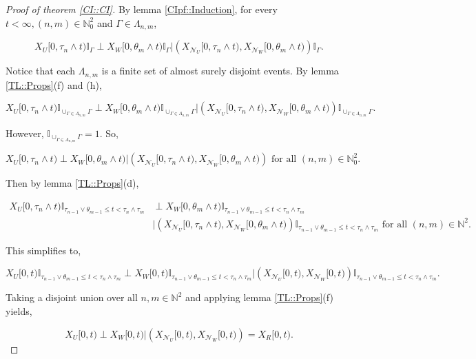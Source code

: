 \documentclass[12pt]{article}
\newcommand{\mb}{\mathbb}
\newcommand{\mc}{\mathcal}
\newcommand{\te}{\text}
\newcommand{\neigh}[1]{\mc{N}_{#1}}					%
\newcommand{\Xf}{X}									%
\newcommand{\vind}[1]{_{#1}}						%
\newcommand{\tmi}[1]{#1}							%
\newcommand{\rt}{\tau}								%
\renewcommand{\it}[1]{_{#1}}						%
\newcommand{\seto}{U}								%
\newcommand{\sett}{W}								%
\newcommand{\setc}{R}								%
\newcommand{\rtt}{\theta}							%
\newcommand{\apath}{\Gamma}						%
\newcommand{\pathset}[2]{\Lambda_{#1,#2}}		%
\newcommand{\indo}{n}							%
\newcommand{\indt}{m}							%
\begin{document}
\begin{proof}[Proof of theorem \ref{CI::CI}]

By lemma \ref{CIpf::Induction}, for every \(t < \infty, (\indo,\indt) \in \mb{N}_0^2\) and \(\apath \in \pathset{\indo}{\indt}\),

\[\Xf\vind{\seto}\tmi{[0,\rt\it{\indo}\wedge t)}\mb{I}_{\apath}\perp \Xf\vind{\sett}\tmi{[0,\rtt\it{\indt}\wedge t)}\mb{I}_{\apath}|\left(\Xf\vind{\neigh{\seto}}\tmi{[0,\rt\it{\indo}\wedge t)},\Xf\vind{\neigh{\sett}}\tmi{[0,\rtt\it{\indt}\wedge t)}\right)\mb{I}_{\apath}.\]

Notice that each \(\pathset{\indo}{\indt}\) is a finite set of almost surely disjoint events. By lemma \ref{TL::Props}(f) and (h),

\[\Xf\vind{\seto}\tmi{[0,\rt\it{\indo}\wedge t)}\mb{I}_{\cup_{\apath \in \pathset{\indo}{\indt}}\apath}\perp \Xf\vind{\sett}\tmi{[0,\rtt\it{\indt}\wedge t)}\mb{I}_{\cup_{\apath \in \pathset{\indo}{\indt}}\apath}|\left(\Xf\vind{\neigh{\seto}}\tmi{[0,\rt\it{\indo}\wedge t)},\Xf\vind{\neigh{\sett}}\tmi{[0,\rtt\it{\indt}\wedge t)}\right)\mb{I}_{\cup_{\apath \in \pathset{\indo}{\indt}}\apath}.\]

However, \(\mb{I}_{\cup_{\apath \in \pathset{\indo}{\indt}}\apath} = 1\). So, 

\[\Xf\vind{\seto}\tmi{[0,\rt\it{\indo}\wedge t)}\perp \Xf\vind{\sett}\tmi{[0,\rtt\it{\indt}\wedge t)}|\left(\Xf\vind{\neigh{\seto}}\tmi{[0,\rt\it{\indo}\wedge t)},\Xf\vind{\neigh{\sett}}\tmi{[0,\rtt\it{\indt}\wedge t)}\right) \te{ for all } (\indo,\indt)\in\mb{N}_0^2.\]

Then by lemma \ref{TL::Props}(d),

\begin{align*}
\Xf\vind{\seto}\tmi{[0,\rt\it{\indo}\wedge t)}\mb{I}_{\rt\it{\indo-1}\vee\rtt\it{\indt-1} \leq t < \rt\it{\indo}\wedge\rt\it{\indt}}&\perp \Xf\vind{\sett}\tmi{[0,\rtt\it{\indt}\wedge t)}\mb{I}_{\rt\it{\indo-1}\vee\rtt\it{\indt-1} \leq t < \rt\it{\indo}\wedge\rt\it{\indt}}\\
&|\left(\Xf\vind{\neigh{\seto}}\tmi{[0,\rt\it{\indo}\wedge t)},\Xf\vind{\neigh{\sett}}\tmi{[0,\rtt\it{\indt}\wedge t)}\right)\mb{I}_{\rt\it{\indo-1}\vee\rtt\it{\indt-1} \leq t < \rt\it{\indo}\wedge\rt\it{\indt}} \te{ for all } (\indo,\indt)\in\mb{N}^2.
\end{align*}


This simplifies to,

\[\Xf\vind{\seto}\tmi{[0,t)}\mb{I}_{\rt\it{\indo-1}\vee\rtt\it{\indt-1} \leq t < \rt\it{\indo}\wedge\rt\it{\indt}}\perp \Xf\vind{\sett}\tmi{[0,t)}\mb{I}_{\rt\it{\indo-1}\vee\rtt\it{\indt-1} \leq t < \rt\it{\indo}\wedge\rt\it{\indt}}|\left(\Xf\vind{\neigh{\seto}}\tmi{[0,t)},\Xf\vind{\neigh{\sett}}\tmi{[0,t)}\right)\mb{I}_{\rt\it{\indo-1}\vee\rtt\it{\indt-1} \leq t < \rt\it{\indo}\wedge\rt\it{\indt}}.\]

Taking a disjoint union over all \(n,m\in\mb{N}^2\) and applying lemma \ref{TL::Props}(f) yields,

\[\Xf\vind{\seto}\tmi{[0,t)}\perp \Xf\vind{\sett}\tmi{[0,t)}|\left(\Xf\vind{\neigh{\seto}}\tmi{[0,t)},\Xf\vind{\neigh{\sett}}\tmi{[0,t)}\right) = \Xf\vind{\setc}\tmi{[0,t)}.\]
\end{proof}
\end{document}
